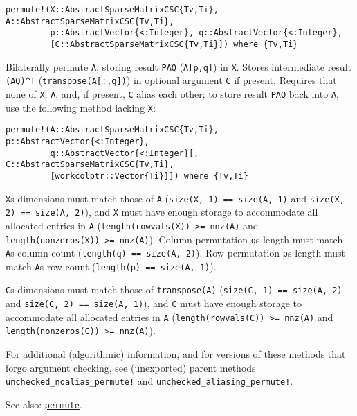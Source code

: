 \begin{adjustwidth}{2em}{0pt}


\begin{verbatim}
permute!(X::AbstractSparseMatrixCSC{Tv,Ti}, A::AbstractSparseMatrixCSC{Tv,Ti},
         p::AbstractVector{<:Integer}, q::AbstractVector{<:Integer},
         [C::AbstractSparseMatrixCSC{Tv,Ti}]) where {Tv,Ti}
\end{verbatim}

Bilaterally permute \texttt{A}, storing result \texttt{PAQ} (\texttt{A[p,q]}) in \texttt{X}. Stores intermediate result \texttt{(AQ){\textasciicircum}T} (\texttt{transpose(A[:,q])}) in optional argument \texttt{C} if present. Requires that none of \texttt{X}, \texttt{A}, and, if present, \texttt{C} alias each other; to store result \texttt{PAQ} back into \texttt{A}, use the following method lacking \texttt{X}:


\begin{lstlisting}
permute!(A::AbstractSparseMatrixCSC{Tv,Ti}, p::AbstractVector{<:Integer},
         q::AbstractVector{<:Integer}[, C::AbstractSparseMatrixCSC{Tv,Ti},
         [workcolptr::Vector{Ti}]]) where {Tv,Ti}
\end{lstlisting}

\texttt{X}{\textquotesingle}s dimensions must match those of \texttt{A} (\texttt{size(X, 1) == size(A, 1)} and \texttt{size(X, 2) == size(A, 2)}), and \texttt{X} must have enough storage to accommodate all allocated entries in \texttt{A} (\texttt{length(rowvals(X)) >= nnz(A)} and \texttt{length(nonzeros(X)) >= nnz(A)}). Column-permutation \texttt{q}{\textquotesingle}s length must match \texttt{A}{\textquotesingle}s column count (\texttt{length(q) == size(A, 2)}). Row-permutation \texttt{p}{\textquotesingle}s length must match \texttt{A}{\textquotesingle}s row count (\texttt{length(p) == size(A, 1)}).

\texttt{C}{\textquotesingle}s dimensions must match those of \texttt{transpose(A)} (\texttt{size(C, 1) == size(A, 2)} and \texttt{size(C, 2) == size(A, 1)}), and \texttt{C} must have enough storage to accommodate all allocated entries in \texttt{A} (\texttt{length(rowvals(C)) >= nnz(A)} and \texttt{length(nonzeros(C)) >= nnz(A)}).

For additional (algorithmic) information, and for versions of these methods that forgo argument checking, see (unexported) parent methods \texttt{unchecked\_noalias\_permute!} and \texttt{unchecked\_aliasing\_permute!}.

See also: \hyperlink{12003442917636022234}{\texttt{permute}}.



\end{adjustwidth}



